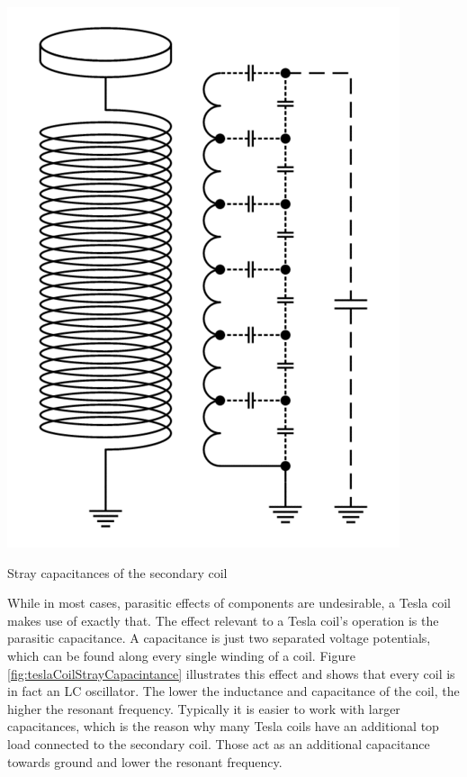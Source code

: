 \begin{marginfigure}[*-5]
\includegraphics[width=\textwidth]{simon/resources/teslaCoilStrayCapacitance.png}
\caption{Stray capacitances of the secondary coil}
\label{fig:teslaCoilStrayCapacintance}
\end{marginfigure}

While in most cases, parasitic effects of components are undesirable, a Tesla coil makes use of exactly that. The effect relevant to a Tesla coil's operation is the parasitic capacitance. A capacitance is just two separated voltage potentials, which can be found along every single winding of a coil. Figure \ref{fig:teslaCoilStrayCapacintance} illustrates this effect and shows that every coil is in fact an LC oscillator. The lower the inductance and capacitance of the coil, the higher the resonant frequency. Typically it is easier to work with larger capacitances, which is the reason why many Tesla coils have an additional top load connected to the secondary coil. Those act as an additional capacitance towards ground and lower the resonant frequency.

